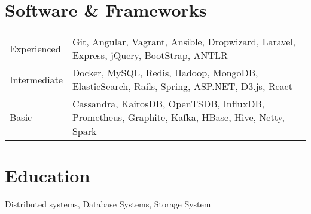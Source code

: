 \documentclass[10pt, letterpaper]{simple-cv}
\begin{document}
\section{Software \& Frameworks}
\begin{tabular}{ l l }
 Experienced & Git, Angular, Vagrant, Ansible, Dropwizard, Laravel, Express, jQuery, BootStrap, ANTLR\\
 Intermediate & Docker, MySQL, Redis, Hadoop, MongoDB, ElasticSearch, Rails, Spring, ASP.NET, D3.js, React \\
 Basic & Cassandra, KairosDB, OpenTSDB, InfluxDB, Prometheus, Graphite, Kafka, HBase, Hive, Netty, Spark
\end{tabular}

\section{Education}
Distributed systems, Database Systems, Storage System


\end{document}
